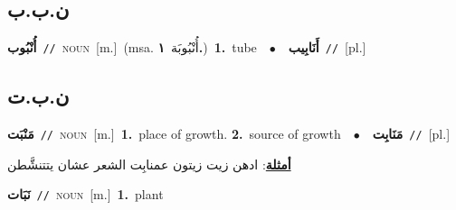\documentclass[10pt,a4paper,twoside]{article} %
\begin{document}
\begin{multicols}{2}
\vspace{-3mm}
\subsection*{\color{blue}\foreignlanguage{arabic}{ن.ب.ب}\color{blue}{ (ntws)}} 

{\setlength\topsep{0pt}\textbf{\foreignlanguage{arabic}{أُنْبُوب}}\ {\color{gray}\texttt{//}\color{black}}\ \textsc{noun}\ [m.]\ \color{gray}(msa. \foreignlanguage{arabic}{أُنْبُوبَة}~\foreignlanguage{arabic}{\textbf{١.}})\color{black}\ \textbf{1.}~tube\ \ $\bullet$\ \ \setlength\topsep{0pt}\textbf{\foreignlanguage{arabic}{أَنَابِيب}}\ {\color{gray}\texttt{//}\color{black}}\ [pl.]\ } \vspace{2mm}

\vspace{-3mm}
\subsection*{\color{blue}\foreignlanguage{arabic}{ن.ب.ت}\color{blue}{}} 

{\setlength\topsep{0pt}\textbf{\foreignlanguage{arabic}{مَنْبَت}}\ {\color{gray}\texttt{//}\color{black}}\ \textsc{noun}\ [m.]\ \textbf{1.}~place of growth.  \textbf{2.}~source of growth\ \ $\bullet$\ \ \setlength\topsep{0pt}\textbf{\foreignlanguage{arabic}{مَنَابِت}}\ {\color{gray}\texttt{//}\color{black}}\ [pl.]\  \begin{flushright}\color{gray}\foreignlanguage{arabic}{\textbf{\underline{\foreignlanguage{arabic}{أمثلة}}}: ادهن زيت زيتون عمنابِت الشعر عشان يتتنشَّطن}\end{flushright}\color{black}} \vspace{2mm}

{\setlength\topsep{0pt}\textbf{\foreignlanguage{arabic}{نَبَات}}\ {\color{gray}\texttt{//}\color{black}}\ \textsc{noun}\ [m.]\ \textbf{1.}~plant\ } \vspace{2mm}


\end{multicols}
\end{document}
